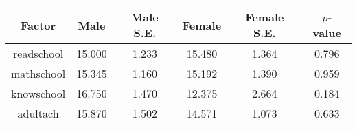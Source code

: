 \begin{longtable}{c c c c c c}
\toprule
\textbf{Factor} & \textbf{Male} & \textbf{Male S.E.}  & \textbf{Female} & \textbf{Female S.E.} & \textbf{$ p $-value} \\
\midrule
readschool & 15.000 & 1.233 &  15.480 & 1.364 & 0.796 \\
mathschool & 15.345 & 1.160 &  15.192 & 1.390 & 0.959 \\
knowschool & 16.750 & 1.470 &  12.375 & 2.664 & 0.184 \\
adultach & 15.870 & 1.502 &  14.571 & 1.073 & 0.633 \\
\bottomrule
\end{longtable}
